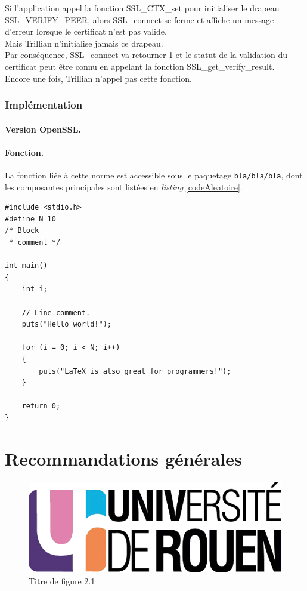 			Si l'application appel la fonction SSL\_CTX\_set pour initialiser
			le drapeau SSL\_VERIFY\_PEER, alors SSL\_connect se ferme et affiche un
			message d'erreur lorsque le certificat n'est pas valide.\\
			Mais Trillian n'initialise jamais ce drapeau.\\
			Par conséquence, SSL\_connect va retourner 1 et le statut de la
			validation du certificat peut être connu en appelant la fonction
			SSL\_get\_verify\_result.\\
			Encore une fois, Trillian n'appel pas cette fonction.\\
			
		
		\subsubsection{Implémentation}
			
			\paragraph{Version OpenSSL.\\}
			
			\paragraph{Fonction.\\}
			La fonction liée à cette norme est accessible sous le paquetage
			\texttt{bla/bla/bla}, dont les composantes principales sont 
			listées en \textit{listing} \ref{codeAleatoire}.
		
		
		\begin{lstlisting}[style=customc,caption=codeAleatoire.c, label=codeAleatoire]
#include <stdio.h>
#define N 10
/* Block
 * comment */
 
int main()
{
    int i;
 
    // Line comment.
    puts("Hello world!");
 
    for (i = 0; i < N; i++)
    {
        puts("LaTeX is also great for programmers!");
    }
 
    return 0;
}
		\end{lstlisting}
		


\section{Recommandations générales}




\begin{figure}[H]
	\centering
	\includegraphics[scale=0.2]{images/logo_univ.png}
	\caption{Titre de figure 2.1}
	\label{fig21}
\end{figure}